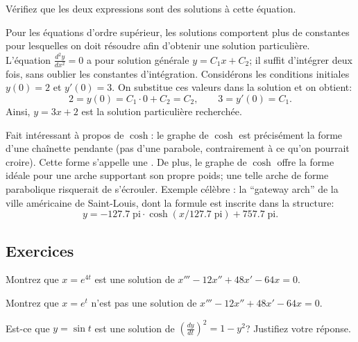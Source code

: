 \begin{exercise}
	Vérifiez que les deux expressions sont des solutions à cette équation.
\end{exercise}

\begin{example}
	Pour les équations d'ordre supérieur, les solutions comportent plus de constantes pour lesquelles on doit résoudre afin d'obtenir une solution particulière.  L'équation  $\frac{d^2y}{dx^2} = 0$ a pour solution générale $y = C_1 x + C_2$; il suffit d'intégrer deux fois, sans oublier les constantes d'intégration.  Considérons les conditions initiales $y(0) = 2$ et $y'(0) = 3$.  On substitue ces valeurs dans la solution et on obtient: 
	\begin{equation*}
		2 = y(0) = C_1 \cdot 0 + C_2 = C_2, \qquad
		3 = y'(0) = C_1 .
	\end{equation*}
	Ainsi, $y = 3x + 2$ est la solution particulière recherchée.
\end{example}

Fait intéressant à propos de $\cosh$:  le graphe de $\cosh$ est précisément la forme d'une cha\^inette pendante (pas d'une parabole, contrairement à ce qu'on pourrait croire).  Cette forme s'appelle une \emph{}.
De plus, le graphe de $\cosh$ offre la forme idéale pour une arche supportant son propre poids; une telle arche de forme parabolique risquerait de s'écrouler.  Exemple célèbre :  la  ``gateway arch'' de la ville 
américaine de Saint-Louis, dont la formule est inscrite dans la structure:
\begin{equation*}
	y = -127.7 \; \textrm{pi} \cdot \cosh({x / 127.7  \; \textrm{pi}}) + 757.7 \;\textrm{pi} .
\end{equation*}


\subsection{Exercices}

\begin{exercise}
	Montrez que $x = e^{4t}$ est une solution de $x'''-12 x'' + 48 x' - 64 x = 0$.
\end{exercise}

\begin{exercise}
	Montrez que $x = e^{t}$ n'est pas une solution de $x'''-12 x'' + 48 x' - 64 x = 0$.
\end{exercise}

\begin{exercise}
	Est-ce que $y = \sin t$ est une solution de ${\left( \frac{dy}{dt} \right)}^2 = 1 - y^2$?
	Justifiez votre réponse.
\end{exercise}

